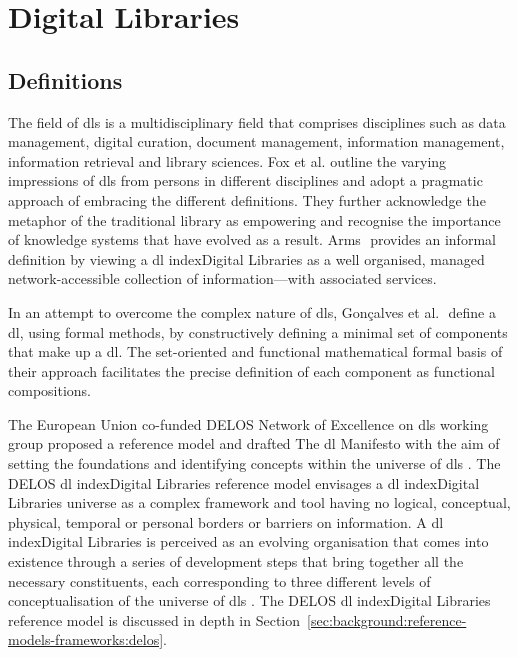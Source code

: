 \section{Digital Libraries}
\label{sec:background:digital-libraries}

\subsection{Definitions}
\label{sec:background:digital-libraries:definitions}

The field of \glspl{dl}  is a multidisciplinary field that comprises
disciplines such as data management, digital curation, document management,
information management, information retrieval and library sciences. Fox et al.
\citep{Fox1995} outline the varying impressions of \glspl{dl}  from
persons
in different disciplines and adopt a pragmatic approach of embracing the
different definitions. They further acknowledge the metaphor of the traditional
library as empowering and recognise the importance of knowledge systems that
have evolved as a result. Arms \citep[see][chap. 1]{Arms2000}⁠ provides an
informal definition by viewing a \gls{dl} index{Digital Libraries} as a well organised, managed
network-accessible collection of information---with associated services.


In an attempt to overcome the complex nature of \glspl{dl}, Gon\c{c}alves et
al. \citep{Gonccalves2004}⁠ define a \gls{dl}, using formal methods, by
constructively defining a minimal set of components that make up a \gls{dl}. The set-oriented and functional mathematical formal basis of their
approach facilitates the precise definition of each component as functional
compositions.

The European Union co-funded DELOS Network of Excellence on \glspl{dl}
working group proposed a reference model and drafted The \gls{dl}
Manifesto with the aim of setting the foundations and identifying concepts
within the universe of \glspl{dl}  \citep{Candela2007a}. The DELOS \gls{dl} index{Digital Libraries} reference model envisages a \gls{dl} index{Digital Libraries} universe as a complex
framework and tool having no logical, conceptual, physical, temporal or personal
borders or barriers on information. A \gls{dl} index{Digital Libraries} is perceived as an
evolving organisation that comes into existence through a series of development
steps that bring together all the necessary constituents, each corresponding to
three different levels of conceptualisation of the universe of \glspl{dl}
\citep{Candela2007}⁠. The DELOS \gls{dl} index{Digital Libraries} reference model is discussed in
depth in Section~\ref{sec:background:reference-models-frameworks:delos}.

